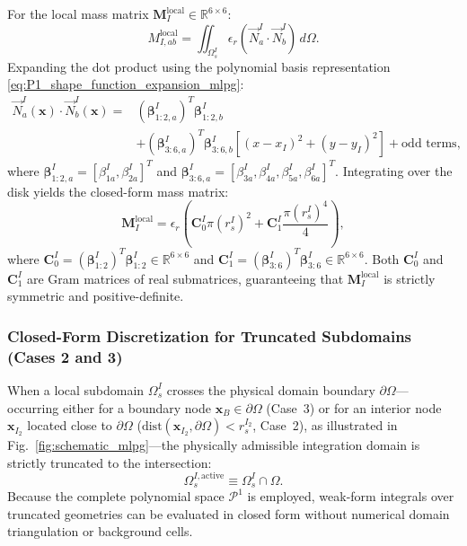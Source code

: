 \documentclass[VANCOUVER,Times1COL]{WileyNJD-v5}
\begin{document}
For the local mass matrix $\mathbf{M}_I^{\mathrm{local}} \in \mathbb{R}^{6 \times 6}$:
\begin{equation}
    M_{I, ab}^{\mathrm{local}} = \iint_{\Omega_s^I} \epsilon_r (\vec{N}_a^I \cdot \vec{N}_b^I) \, d\Omega.
\end{equation}
Expanding the dot product using the polynomial basis representation \eqref{eq:P1_shape_function_expansion_mlpg}:
\begin{equation}
    \begin{aligned}
        \vec{N}_a^I(\mathbf{x}) \cdot \vec{N}_b^I(\mathbf{x}) = & (\boldsymbol{\beta}_{1:2, a}^I)^T \boldsymbol{\beta}_{1:2, b}^I                                                                \\
                                                                & + (\boldsymbol{\beta}_{3:6, a}^I)^T \boldsymbol{\beta}_{3:6, b}^I \left[ (x - x_I)^2 + (y - y_I)^2 \right] + \text{odd terms},
    \end{aligned}
\end{equation}
where $\boldsymbol{\beta}_{1:2, a}^I = [\beta_{1a}^I, \beta_{2a}^I]^T$ and $\boldsymbol{\beta}_{3:6, a}^I = [\beta_{3a}^I, \beta_{4a}^I, \beta_{5a}^I, \beta_{6a}^I]^T$.
Integrating over the disk yields the closed-form mass matrix:
\begin{equation}
    \mathbf{M}_I^{\mathrm{local}} = \epsilon_r \left( \mathbf{C}_0^I \pi (r_s^I)^2 + \mathbf{C}_1^I \frac{\pi (r_s^I)^4}{4} \right),
    \label{eq:m_local_analytic}
\end{equation}
where $\mathbf{C}_0^I = (\boldsymbol{\beta}_{1:2}^I)^T \boldsymbol{\beta}_{1:2}^I \in \mathbb{R}^{6 \times 6}$ and $\mathbf{C}_1^I = (\boldsymbol{\beta}_{3:6}^I)^T \boldsymbol{\beta}_{3:6}^I \in \mathbb{R}^{6 \times 6}$. Both $\mathbf{C}_0^I$ and $\mathbf{C}_1^I$ are Gram matrices of real submatrices, guaranteeing that $\mathbf{M}_I^{\mathrm{local}}$ is strictly symmetric and positive-definite.

\subsubsection{Closed-Form Discretization for Truncated Subdomains (Cases 2 and 3)}
\label{subsubsec:truncated_subdomains_analytic}

When a local subdomain $\Omega_s^I$ crosses the physical domain boundary $\partial\Omega$---occurring either for a boundary node $\mathbf{x}_B \in \partial\Omega$ (Case~3) or for an interior node $\mathbf{x}_{I_2}$ located close to $\partial\Omega$ ($\mathrm{dist}(\mathbf{x}_{I_2}, \partial\Omega) < r_s^{I_2}$, Case~2), as illustrated in Fig.~\ref{fig:schematic_mlpg}---the physically admissible integration domain is strictly truncated to the intersection:
\begin{equation}
    \Omega_s^{I, \mathrm{active}} \equiv \Omega_s^I \cap \Omega.
    \label{eq:truncated_subdomain_def}
\end{equation}
Because the complete polynomial space $\mathcal{P}^1$ is employed, weak-form integrals over truncated geometries can be evaluated in closed form without numerical domain triangulation or background cells.
\end{document}
